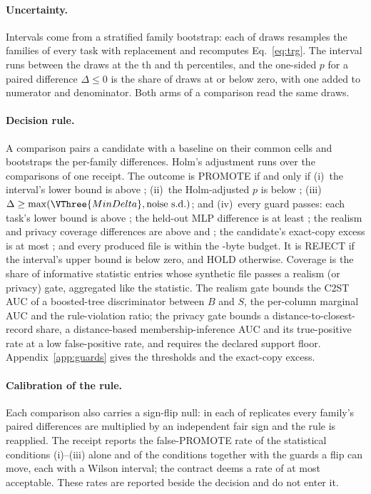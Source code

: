\paragraph{Uncertainty.}
Intervals come from a stratified family bootstrap: each of  draws resamples the families of every task with replacement and recomputes Eq.~\eqref{eq:trg}.
The  interval runs between the draws at the th and th percentiles, and the one-sided $p$ for a paired difference $\Delta\le 0$ is the share of draws at or below zero, with one added to numerator and denominator.
Both arms of a comparison read the same draws.

\paragraph{Decision rule.}
A comparison pairs a candidate with a baseline on their common cells and bootstraps the per-family differences.
Holm's adjustment runs over the comparisons of one receipt.
The outcome is PROMOTE if and only if
(i)~the interval's lower bound is above ;
(ii)~the Holm-adjusted $p$ is below ;
(iii)~$\Delta \ge \max(\VThree{MinDelta}, \text{noise s.d.})$; and
(iv)~every guard passes: each task's lower bound is above ; the held-out MLP difference is at least ; the realism and privacy coverage differences are above  and ; the candidate's exact-copy excess is at most ; and every produced file is within the -byte budget.
It is REJECT if the interval's upper bound is below zero, and HOLD otherwise.
Coverage is the share of informative statistic entries whose synthetic file passes a realism (or privacy) gate, aggregated like the statistic.
The realism gate bounds the C2ST AUC of a boosted-tree discriminator between $B$ and $S$, the per-column marginal AUC and the rule-violation ratio; the privacy gate bounds a distance-to-closest-record share, a distance-based membership-inference AUC and its true-positive rate at a low false-positive rate, and requires the declared support floor.
Appendix~\ref{app:guards} gives the thresholds and the exact-copy excess.

\paragraph{Calibration of the rule.}
Each comparison also carries a sign-flip null: in each of  replicates every family's paired differences are multiplied by an independent fair sign and the rule is reapplied.
The receipt reports the false-PROMOTE rate of the statistical conditions (i)--(iii) alone and of the conditions together with the guards a flip can move, each with a Wilson interval; the contract deems a rate of at most  acceptable.
These rates are reported beside the decision and do not enter it.

